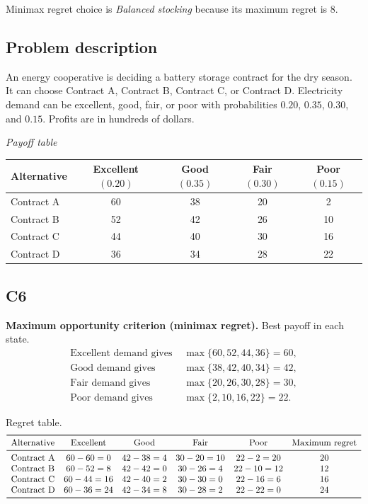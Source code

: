 \begin{ExamProblems}
		Minimax regret choice is \emph{Balanced stocking} because its maximum regret is $8$.

		\item
		\subsection*{Problem description}
		An energy cooperative is deciding a battery storage contract for the dry season. It can choose Contract A, Contract B, Contract C, or Contract D. Electricity demand can be excellent, good, fair, or poor with probabilities $0.20$, $0.35$, $0.30$, and $0.15$. Profits are in hundreds of dollars.

		\begin{center}
			\textit{Payoff table}\\
			\begin{tabular}{l c c c c}
				\toprule
				Alternative & Excellent $(0.20)$ & Good $(0.35)$ & Fair $(0.30)$ & Poor $(0.15)$ \\
				\midrule
				Contract A & 60 & 38 & 20 & 2 \\
				Contract B & 52 & 42 & 26 & 10 \\
				Contract C & 44 & 40 & 30 & 16 \\
				Contract D & 36 & 34 & 28 & 22 \\
				\bottomrule
			\end{tabular}
		\end{center}

		\subsection*{C6}
		\textbf{Maximum opportunity criterion (minimax regret).} Best payoff in each state.
		\[
		\begin{aligned}
		\text{Excellent demand gives } &\max\{60,52,44,36\}=60,\\
		\text{Good demand gives } &\max\{38,42,40,34\}=42,\\
		\text{Fair demand gives } &\max\{20,26,30,28\}=30,\\
		\text{Poor demand gives } &\max\{2,10,16,22\}=22.
		\end{aligned}
		\]

		Regret table.
		\[
		\begin{array}{lccccc}
			\toprule
			\text{Alternative} & \text{Excellent} & \text{Good} & \text{Fair} & \text{Poor} & \text{Maximum regret}\\
			\midrule
			\text{Contract A} & 60-60=0 & 42-38=4 & 30-20=10 & 22-2=20 & 20\\
			\text{Contract B} & 60-52=8 & 42-42=0 & 30-26=4 & 22-10=12 & 12\\
			\text{Contract C} & 60-44=16 & 42-40=2 & 30-30=0 & 22-16=6 & 16\\
			\text{Contract D} & 60-36=24 & 42-34=8 & 30-28=2 & 22-22=0 & 24\\
			\bottomrule
		\end{array}
		\]


\end{ExamProblems}
